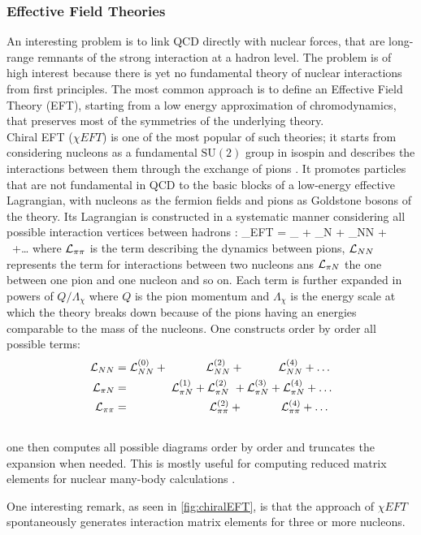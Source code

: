 \subsubsection{Effective Field Theories}
An interesting problem is to link QCD directly with nuclear forces, that are long-range remnants of the strong interaction at a hadron level. The problem is of high interest because there is yet no fundamental theory of nuclear interactions from first principles. The most common approach is to define an Effective Field Theory (EFT), starting from a low energy approximation of chromodynamics, that preserves most of the symmetries of the underlying theory. \\
Chiral EFT ($\chi EFT$) is one of the most popular of such theories; it starts from considering nucleons as a fundamental $\mathrm{SU}(2)$ group in isospin and describes the interactions between them through the exchange of pions \cite{machleidt_chiral_2016}. It promotes particles that are not fundamental in QCD to the basic blocks of a low-energy effective Lagrangian, with nucleons as the fermion fields and pions as Goldstone bosons \cite{peskin} of the theory. Its Lagrangian is constructed in a systematic manner considering all possible interaction vertices between hadrons \cite{epelbaum_nuclear_2010}:
\beq
    \Lagr_{\chi EFT} = \Lagr_{\pi\pi} +  \Lagr_{\pi N} + \Lagr_{NN} + ~ ~+\dots
\eeq 
where $\mathcal{L}_{\pi\pi}$ is the term describing the dynamics between pions, $\mathcal{L}_{NN}$ represents the term for interactions between two nucleons ans $\mathcal{L}_{\pi N}$ the one between one pion and one nucleon and so on. Each term is further expanded in powers of $Q/\Lambda_\chi$ where $Q$ is the pion momentum and $\Lambda_\chi$ is the energy scale at which the theory breaks down because of the pions having an energies comparable to the mass of the nucleons. One constructs order by order all possible terms:
\begin{align}
    \mathcal{L}_{NN} &= \mathcal{L}_{NN}^{(0)} + ~~~~~~~~~~  \mathcal{L}_{NN}^{(2)} + ~~~~~~~~~  \mathcal{L}_{NN}^{(4)} + \dots\\\nonumber
    \mathcal{L}_{\pi N} &= ~~~~~~~~~~~ \mathcal{L}_{\pi N}^{(1)} + \mathcal{L}_{\pi N}^{(2)} ~+  \mathcal{L}_{\pi N}^{(3)} + \mathcal{L}_{\pi N}^{(4)} + \dots  \\\nonumber
    \mathcal{L}_{\pi \pi} &= ~~~~~~~~~~~~~~~~~~~~~ \mathcal{L}_{\pi \pi}^{(2)} +  ~~~~~~~~~~  \mathcal{L}_{\pi \pi}^{(4)} + \dots  \\\nonumber
\end{align} 
one then computes all possible diagrams order by order and truncates the expansion when needed. This is mostly useful for computing reduced matrix elements for nuclear many-body calculations \cite{hagen_coupled-cluster_2014}. 

One interesting remark, as seen in \cref{fig:chiralEFT}, is that the approach of $\chi EFT$ spontaneously generates interaction matrix elements for three or more nucleons. 